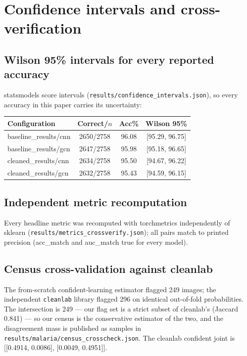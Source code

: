 
\section{Confidence intervals and cross-verification}
\subsection{Wilson 95\% intervals for every reported accuracy}
statsmodels score intervals (\texttt{results/confidence\_intervals.json}),
so every accuracy in this paper carries its uncertainty:
\begin{longtable}{l c c c}
\hline Configuration & Correct/$n$ & Acc\% & Wilson 95\% \\ \hline \endhead
baseline\_results/cnn & 2650/2758 & 96.08 & [95.29, 96.75] \\
baseline\_results/gcn & 2647/2758 & 95.98 & [95.18, 96.65] \\
cleaned\_results/cnn & 2634/2758 & 95.50 & [94.67, 96.22] \\
cleaned\_results/gcn & 2632/2758 & 95.43 & [94.59, 96.15] \\
\hline
\end{longtable}
\subsection{Independent metric recomputation}
Every headline metric was recomputed with torchmetrics independently of
sklearn (\texttt{results/metrics\_crossverify.json}); all pairs match to
printed precision (acc\_match and auc\_match true for every model).

\subsection{Census cross-validation against cleanlab}
The from-scratch confident-learning estimator flagged 249
images; the independent \texttt{cleanlab} library flagged
296 on identical out-of-fold probabilities. The
intersection is 249 --- our flag set is a strict subset of
cleanlab's (Jaccard 0.841) --- so our census is the
conservative estimator of the two, and the disagreement mass is published
as samples in \texttt{results/malaria/census\_crosscheck.json}.
The cleanlab confident joint is
[[0.4914, 0.0086],
 [0.0049, 0.4951]].

